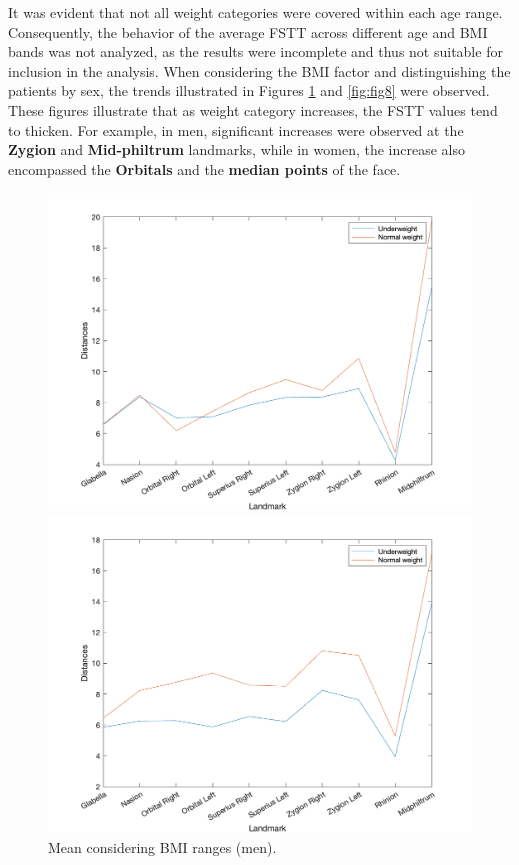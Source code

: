 \documentclass[journal,article,submit,pdftex,moreauthors]{Definitions/mdpi}
\begin{document}
It was evident that not all weight categories were covered within each age range. Consequently, the behavior of the average FSTT across different age and BMI bands was not analyzed, as the results were incomplete and thus not suitable for inclusion in the analysis.
When considering the BMI factor and distinguishing the patients by sex, the trends illustrated in Figures \ref{fig:fig7} and \ref{fig:fig8} were observed.
These figures illustrate that as weight category increases, the FSTT values tend to thicken. For example, in men, significant increases were observed at the \textbf{Zygion} and \textbf{Mid-philtrum} landmarks, while in women, the increase also encompassed the \textbf{Orbitals} and the \textbf{median points} of the face.

\vspace{-0.2cm}
\begin{figure}[H]
    \begin{minipage}{0.52\textwidth}
        \centering
        \includegraphics[width=\linewidth]{Definitions/Men_mean_BMI_withoutAge.png}
        \vspace{-0.3cm}
        \caption{Mean considering BMI ranges (men).}
        \label{fig:fig7}
    \end{minipage}
    \hfill
    \begin{minipage}{0.52\textwidth}
        \centering
        \includegraphics[width=\linewidth]{Definitions/Women_mean_BMI_withoutAge.png}

\end{minipage}
\end{figure}
\end{document}
